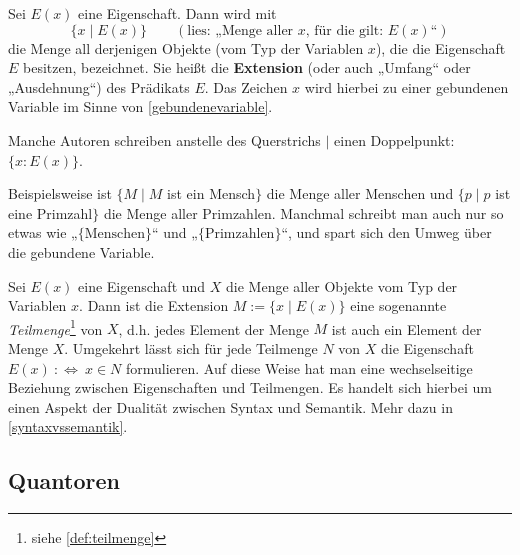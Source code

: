 \begin{nota} \label{extensionimlogikkapitel}
    Sei $E(x)$ eine Eigenschaft. Dann wird mit
        \[ \{ x\mid E(x) \} \qquad (\text{lies: „Menge aller $x$, für die gilt: $E(x)$“})\]
    die Menge all derjenigen Objekte (vom Typ der Variablen $x$), die die Eigenschaft $E$ besitzen, bezeichnet. Sie heißt die \textbf{Extension} (oder auch „Umfang“ oder „Ausdehnung“) des Prädikats $E$. Das Zeichen $x$ wird hierbei zu einer gebundenen Variable im Sinne von \cref{gebundenevariable}.

    Manche Autoren schreiben anstelle des Querstrichs $\vert$ einen Doppelpunkt: $\{x: E(x) \}$.
\end{nota}


\begin{bsp}
    Beispielsweise ist $\{M\mid M$ ist ein Mensch$\}$ die Menge aller Menschen und $\{p\mid p$ ist eine Primzahl$\}$ die Menge aller Primzahlen. Manchmal schreibt man auch nur so etwas wie „$\{\text{Menschen}\}$“ und „$\{\text{Primzahlen}\}$“, und spart sich den Umweg über die gebundene Variable.
\end{bsp}


\begin{vorschau} \label{mengenvseig}
    Sei $E(x)$ eine Eigenschaft und $X$ die Menge aller Objekte vom Typ der Variablen $x$. Dann ist die Extension $M:=\{x\mid E(x)\}$ eine sogenannte \emph{Teilmenge}\footnote{siehe \cref{def:teilmenge}} von $X$, d.h. jedes Element der Menge $M$ ist auch ein Element der Menge $X$. Umgekehrt lässt sich für jede Teilmenge $N$ von $X$ die Eigenschaft $E(x)\ :\Leftrightarrow\ x\in N$ formulieren. Auf diese Weise hat man eine wechselseitige Beziehung zwischen Eigenschaften und Teilmengen. Es handelt sich hierbei um einen Aspekt der Dualität zwischen Syntax und Semantik. Mehr dazu in \cref{syntaxvssemantik}.
\end{vorschau}





\subsection*{Quantoren}


